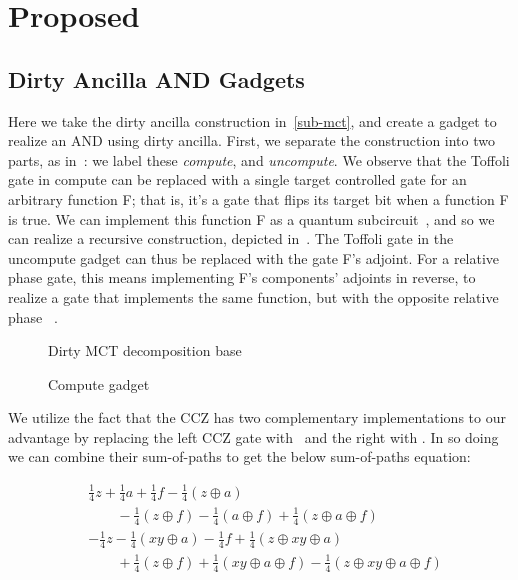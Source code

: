 \section{Proposed}
\label{Pro}

\subsection{Dirty Ancilla AND Gadgets}
\label{sub-synth}
Here we take the dirty ancilla construction in~\ref{sub-mct}, and create a gadget to
realize an AND using dirty ancilla. First, we separate the construction into
two parts, as in~: we label these \emph{compute}, and \emph{uncompute}.
We observe that the Toffoli gate in compute can be replaced with a single target controlled
gate for an arbitrary function F; that is, it's a gate that flips its target bit when a
function F is true. We can implement this function F as a quantum
subcircuit~\cite{bib-amy-phase-state}, and so we can realize a recursive construction, depicted
in~. The Toffoli gate in the uncompute gadget can thus be replaced with the
gate F's adjoint. For a relative phase gate, this means implementing F's components' adjoints in
reverse, to realize a gate that implements the same function, but with the opposite relative phase
~\cite{bib-maslov-rtof}.

\begin{figure}[t]
  \centering
  \scalebox{1.0} {
    
  }
  \caption{Dirty MCT decomposition base}
  \label{fig-dirt-mct-org}
\end{figure}

\begin{figure}[t]
  \centering
  \scalebox{1.0} {
    
  }
  \caption{Compute gadget}
  \label{fig-compute}
\end{figure}

We utilize the fact that the CCZ has two complementary implementations to our advantage by replacing the left CCZ
gate with~ and the right with . In so doing we can combine their
sum-of-paths to get the below sum-of-paths equation:

\begin{equation}
  \label{eq-toff-tot}
  \begin{aligned}
    &\frac{1}{4}z + \frac{1}{4}a + \frac{1}{4}f - \frac{1}{4}(z \oplus a) \\
    &\qquad -\frac{1}{4}(z \oplus f) - \frac{1}{4}(a \oplus f) + \frac{1}{4}(z \oplus a \oplus f)\\
    &- \frac{1}{4}z - \frac{1}{4}(xy \oplus a) - \frac{1}{4} f + \frac{1}{4}(z \oplus xy \oplus a) \\
    &\qquad + \frac{1}{4}(z \oplus f) + \frac{1}{4}(xy \oplus a \oplus f) - \frac{1}{4}(z \oplus xy \oplus a \oplus f)
  \end{aligned}
\end{equation}

